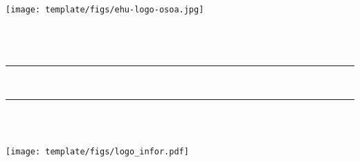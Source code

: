 \thispagestyle{empty}

\newcommand{\HRule}{\rule{\linewidth}{0.5mm}} 

\begin{center}
  \texttt{[image: template/figs/ehu-logo-osoa.jpg]} \\[1.3cm]
   {\Large \masterName}\\
   {\masterSpecialization}\\[1.5cm]

  {\large {\mapizenburua}}\\[0.2cm]
\HRule \\[0.5cm]

{ \LARGE 
\begin{spacing}{1}
  \textbf{\izenburua}
\end{spacing}
}
 \vspace{0.5cm}
\HRule \\[1.0cm]

{ \authorLabel\\}
{\Large \textsl{\egilea}}
\vspace{2.0 cm}

\texttt{[image: template/figs/logo\_infor.pdf]} \\[0.1cm]
{\large \textsf{\masterDate}}

\end{center}

